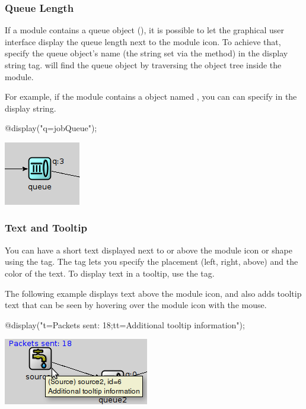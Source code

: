 \subsubsection{Queue Length}

If a module contains a queue object (), it is possible to
let the graphical user interface display the queue length next to the
module icon. To achieve that, specify the queue object's name (the string
set via the  method) in the  display string tag.
{\opp} will find the queue object by traversing the object tree inside
the module.

For example, if the module contains a  object named
, you can can specify  in the display
string.

\begin{ned}
@display("q=jobQueue");
\end{ned}

\begin{center}
\includegraphics{figures/graphics-qtag}
\end{center}

\subsubsection{Text and Tooltip}

You can have a short text displayed next to or above the module icon or
shape using the  tag. The tag lets you specify the placement (left,
right, above) and the color of the text. To display text in a tooltip, use
the  tag.

The following example displays text above the module icon, and also adds
tooltip text that can be seen by hovering over the module icon with the
mouse.

\begin{ned}
@display("t=Packets sent: 18;tt=Additional tooltip information");
\end{ned}

\begin{center}
\includegraphics{figures/graphics-ttag}
\end{center}

